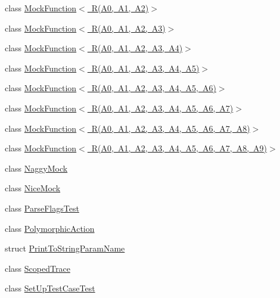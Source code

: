 \begin{DoxyCompactItemize}
\item 
class \mbox{\hyperlink{classtesting_1_1MockFunction_3_01R_07A0_00_01A1_00_01A2_08_4}{Mock\+Function$<$ R(\+A0, A1, A2)$>$}}
\item 
class \mbox{\hyperlink{classtesting_1_1MockFunction_3_01R_07A0_00_01A1_00_01A2_00_01A3_08_4}{Mock\+Function$<$ R(\+A0, A1, A2, A3)$>$}}
\item 
class \mbox{\hyperlink{classtesting_1_1MockFunction_3_01R_07A0_00_01A1_00_01A2_00_01A3_00_01A4_08_4}{Mock\+Function$<$ R(\+A0, A1, A2, A3, A4)$>$}}
\item 
class \mbox{\hyperlink{classtesting_1_1MockFunction_3_01R_07A0_00_01A1_00_01A2_00_01A3_00_01A4_00_01A5_08_4}{Mock\+Function$<$ R(\+A0, A1, A2, A3, A4, A5)$>$}}
\item 
class \mbox{\hyperlink{classtesting_1_1MockFunction_3_01R_07A0_00_01A1_00_01A2_00_01A3_00_01A4_00_01A5_00_01A6_08_4}{Mock\+Function$<$ R(\+A0, A1, A2, A3, A4, A5, A6)$>$}}
\item 
class \mbox{\hyperlink{classtesting_1_1MockFunction_3_01R_07A0_00_01A1_00_01A2_00_01A3_00_01A4_00_01A5_00_01A6_00_01A7_08_4}{Mock\+Function$<$ R(\+A0, A1, A2, A3, A4, A5, A6, A7)$>$}}
\item 
class \mbox{\hyperlink{classtesting_1_1MockFunction_3_01R_07A0_00_01A1_00_01A2_00_01A3_00_01A4_00_01A5_00_01A6_00_01A7_00_01A8_08_4}{Mock\+Function$<$ R(\+A0, A1, A2, A3, A4, A5, A6, A7, A8)$>$}}
\item 
class \mbox{\hyperlink{classtesting_1_1MockFunction_3_01R_07A0_00_01A1_00_01A2_00_01A3_00_01A4_00_01A5_00_01A6_00_01A7_00_01A8_00_01A9_08_4}{Mock\+Function$<$ R(\+A0, A1, A2, A3, A4, A5, A6, A7, A8, A9)$>$}}
\item 
class \mbox{\hyperlink{classtesting_1_1NaggyMock}{Naggy\+Mock}}
\item 
class \mbox{\hyperlink{classtesting_1_1NiceMock}{Nice\+Mock}}
\item 
class \mbox{\hyperlink{classtesting_1_1ParseFlagsTest}{Parse\+Flags\+Test}}
\item 
class \mbox{\hyperlink{classtesting_1_1PolymorphicAction}{Polymorphic\+Action}}
\item 
struct \mbox{\hyperlink{structtesting_1_1PrintToStringParamName}{Print\+To\+String\+Param\+Name}}
\item 
class \mbox{\hyperlink{classtesting_1_1ScopedTrace}{Scoped\+Trace}}
\item 
class \mbox{\hyperlink{classtesting_1_1SetUpTestCaseTest}{Set\+Up\+Test\+Case\+Test}}
\item 

\end{DoxyCompactItemize}
